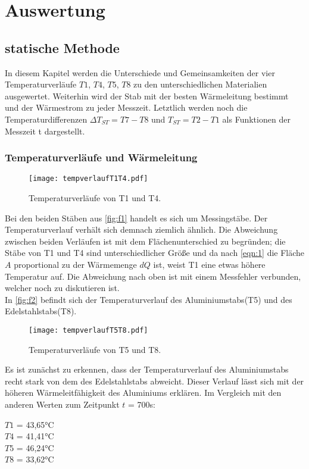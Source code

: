 \section{Auswertung}
\label{sec:Auswertung}

\subsection{statische Methode}
In diesem Kapitel werden die Unterschiede und Gemeinsamkeiten der vier 
Temperaturverläufe $T1$, $T4$, $T5$, $T8$ zu den unterschiedlichen Materialien 
ausgewertet. Weiterhin wird der Stab mit der besten Wärmeleitung bestimmt und 
der Wärmestrom zu jeder Messzeit. Letztlich werden noch die Temperaturdifferenzen 
$\Delta T_{ST}=T7-T8$ und $T_{ST}=T2-T1$ als Funktionen der Messzeit t dargestellt.

\subsubsection{Temperaturverläufe und Wärmeleitung}
\begin{figure}[H]
    \centering
    \texttt{[image: tempverlaufT1T4.pdf]}
    \caption{Temperaturverläufe von T1 und T4.}
    \label{fig:f1}
\end{figure}
Bei den beiden Stäben aus \autoref{fig:f1} handelt es sich um Messingstäbe. Der 
Temperaturverlauf verhält sich demnach ziemlich ähnlich. Die Abweichung zwischen 
beiden Verläufen ist mit dem Flächenunterschied zu begründen; die Stäbe von 
T1 und T4 sind unterschiedlicher Größe und da nach \autoref{eqn:1} die Fläche
$A$ proportional zu der Wärmemenge $dQ$ ist, weist T1 eine etwas höhere Temperatur 
auf. Die Abweichung nach oben ist mit einem Messfehler verbunden, welcher noch 
zu diskutieren ist.
\\
In \autoref{fig:f2} befindt sich der Temperaturverlauf des Aluminiumstabs(T5)
und des Edelstahlstabs(T8).
\begin{figure}[H]
    \centering
    \texttt{[image: tempverlaufT5T8.pdf]}
    \caption{Temperaturverläufe von T5 und T8.}
    \label{fig:f2}
\end{figure}
Es ist zunächst zu erkennen, dass der Temperaturverlauf des Aluminiumstabs recht 
stark von dem des Edelstahlstabs abweicht. Dieser Verlauf lässt sich mit der 
höheren Wärmeleitfähigkeit des Aluminiums erklären. Im Vergleich mit den anderen 
Werten zum Zeitpunkt $t$ = 700s:
\begin{center}
  $T1$ = 43,65°C\\
  $T4$ = 41,41°C\\
  $T5$ = 46,24°C\\
  $T8$ = 33,62°C
\end{center}


